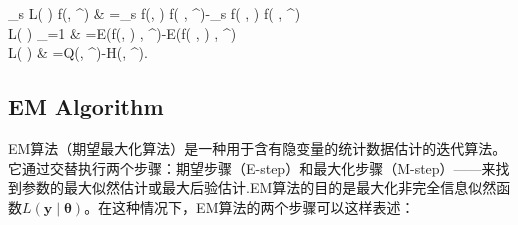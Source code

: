 \documentclass[UTF8,12pt]{ctexart}
\numberwithin{equation}{section}%
\begin{document}
    \begin{DispWithArrows}[tikz=blue,tagged-lines=last]
    	\sum_s \log L( \mid \boldsymbol{\theta}) \cdot f\left(\mid {}, \boldsymbol{\theta}^{\prime}\right) & =\sum_s \log f(,  \mid \boldsymbol{\theta}) \cdot f\left( \mid {}, \boldsymbol{\theta}^{\prime}\right)-\sum_s \log f( \mid {}, \boldsymbol{\theta}) \cdot f\left( \mid {}, \boldsymbol{\theta}^{\prime}\right) \\
    	\Rightarrow \quad  \log L( \mid \boldsymbol{\theta}) \cdot {}_{=1}  & =E\left(\log f(,  \mid \boldsymbol{\theta}) \mid {}, \boldsymbol{\theta}^{\prime}\right)-E\left(\log f( \mid {}, \boldsymbol{\theta}) \mid {}, \boldsymbol{\theta}^{\prime}\right) \\
    	\Rightarrow \quad		\log L( \mid \boldsymbol{\theta})		& =Q\left(\boldsymbol{\theta}, \boldsymbol{\theta}^{\prime}\right)-H\left(\boldsymbol{\theta}, \boldsymbol{\theta}^{\prime}\right).\label{likelihood relation with Q function}
    \end{DispWithArrows}
	
	\subsection{EM Algorithm}
	EM算法（期望最大化算法）是一种用于含有隐变量的统计数据估计的迭代算法。它通过交替执行两个步骤：期望步骤（E-step）和最大化步骤（M-step）——来找到参数的最大似然估计或最大后验估计.EM算法的目的是最大化非完全信息似然函数$L(\mathbf{y} \mid \boldsymbol{\theta})$。在这种情况下，EM算法的两个步骤可以这样表述：
	
\end{document}

